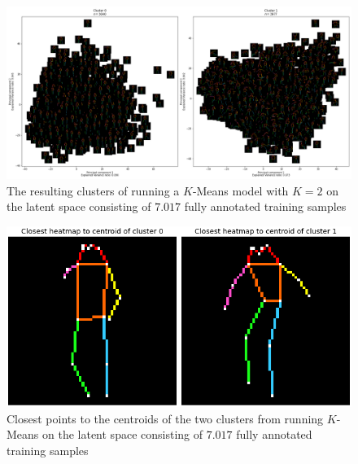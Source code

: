 \documentclass[./main.tex]{subfiles}
\begin{document}
\begin{figure}[t]
    \centering
    \includegraphics[width = \textwidth]{entities/cluster_full_skeletons.png}
    \caption{The resulting clusters of running a $K$-Means model with $K = 2$ on the latent space consisting of $7.017$ fully annotated training samples}
    \label{fig:clusters_full_skeletons}
\end{figure}
\begin{figure}[b]
    \centering
    \includegraphics[height = 4 cm]{entities/centroids_full_skeletons.png}
    \caption{Closest points to the centroids of the two clusters from running $K$-Means on the latent space consisting of $7.017$ fully annotated training samples}
    \label{fig:centroids_full}
\end{figure}
\end{document}
